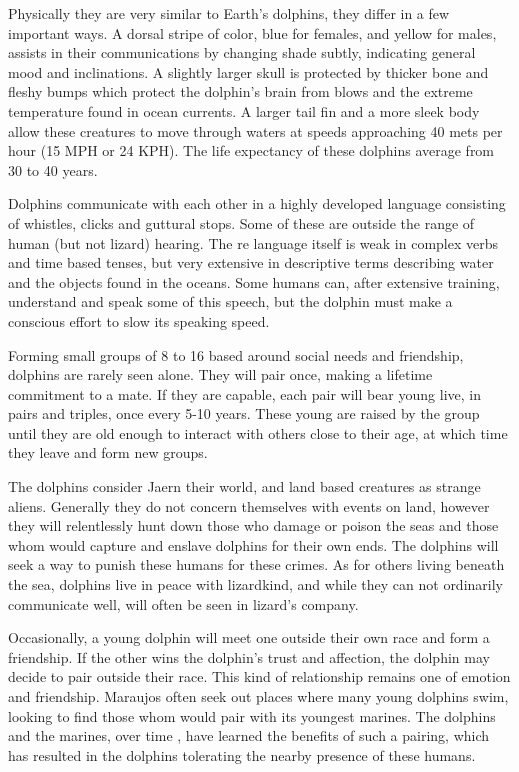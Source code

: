 \begin{multicols*}{2}
Physically they are very similar to Earth's dolphins, they differ in a few important ways. A dorsal stripe of color, blue for females, and yellow for males, assists in their communications by changing shade subtly, indicating general mood and inclinations. A slightly larger skull is protected by thicker bone and fleshy bumps which protect the dolphin's brain from blows and the extreme temperature found in ocean
currents. A larger tail fin and a more sleek body allow these creatures to move through waters at speeds approaching 40 mets per hour (15 MPH or 24 KPH). The life expectancy of these dolphins average from 30 to 40 years.

Dolphins communicate with each other in a highly developed language consisting of whistles, clicks and guttural stops. Some of these are outside the range of human (but not lizard) hearing. The re language itself is weak in complex verbs and time based tenses, but very extensive in descriptive terms describing water and the objects found in the oceans. Some humans can, after extensive training, understand and speak some of this speech, but the dolphin must make a conscious effort to slow its speaking speed.

Forming small groups of 8 to 16 based around social needs and friendship, dolphins are rarely seen alone. They will pair once, making a lifetime commitment to a mate. If they are capable, each pair will bear young live, in pairs and triples, once every 5-10 years. These young are raised by the group until they are old enough to interact with others close to their age, at which time they leave and form new groups.

The dolphins consider Jaern their world, and land
based creatures as strange aliens. Generally they do not concern themselves with events on land, however they will relentlessly hunt down those who damage or poison the seas and those whom would capture and enslave dolphins for their own ends. The dolphins will seek a way to punish these humans for these crimes. As for others living beneath the sea, dolphins live in peace with lizardkind, and while they can not ordinarily communicate well, will often be seen in lizard’s company.

Occasionally, a young dolphin will meet one outside their own race and form a friendship. If the other wins the dolphin’s trust and affection, the dolphin may decide to pair outside their race. This kind of relationship remains one of emotion and friendship. Maraujos often seek out places where many young dolphins swim, looking to find those whom would pair with its youngest marines. The dolphins and the marines, over time , have learned the benefits of such a pairing, which has resulted in the dolphins tolerating the nearby presence of these humans.


\end{multicols*}
